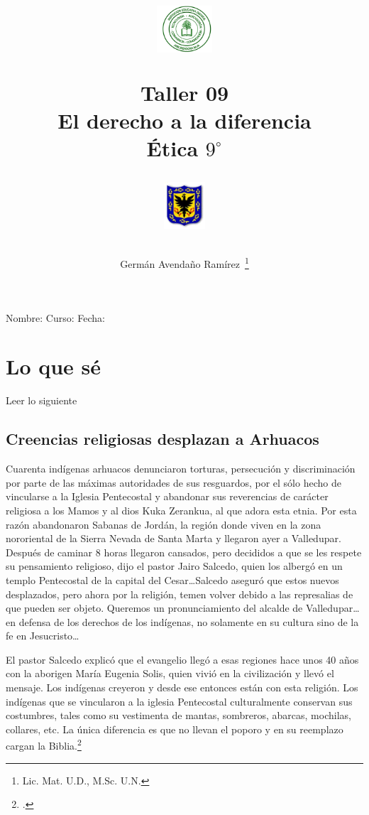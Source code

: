 \documentclass[10pt,twoside]{article}
\author{Germ\'an Avenda\~no Ram\'irez~\thanks{Lic. Mat. U.D., M.Sc. U.N.}}
\title{\begin{minipage}{.2\textwidth}
\includegraphics[height=1.75cm]{Images/logo-colegio.png}\end{minipage}
\begin{minipage}{.55\textwidth}
\begin{center}
Taller 09\\
El derecho a la diferencia\\
Ética $9^{\circ}$
\end{center}
\end{minipage}\hfill
\begin{minipage}{.2\textwidth}
\includegraphics[height=1.75cm]{Images/logo-sed.png} 
\end{minipage}}
\date{}
\begin{document}
\maketitle
Nombre: \hrulefill Curso: \underline{\hspace*{44pt}} Fecha: \underline{\hspace*{2.5cm}}
\section*{Lo que s\'{e}}
Leer lo siguiente
\subsection*{Creencias religiosas desplazan a Arhuacos}
Cuarenta indígenas arhuacos denunciaron torturas, persecución y discriminación por parte de las máximas autoridades de sus resguardos, por el sólo hecho de vincularse a la Iglesia Pentecostal y abandonar sus reverencias de carácter religiosa a los Mamos y al dios Kuka Zerankua, al que adora esta etnia. Por esta razón abandonaron Sabanas de Jordán,
la región donde viven en la zona nororiental de la Sierra Nevada de Santa Marta y llegaron ayer a Valledupar. Después de caminar 8 horas llegaron cansados, pero decididos a que se les respete su pensamiento religioso, dijo el pastor Jairo Salcedo, quien los albergó en un templo Pentecostal de la capital del Cesar\ldots Salcedo aseguró que estos nuevos desplazados, pero ahora por la religión, temen volver debido a
las represalias de que pueden ser objeto. Queremos un pronunciamiento del alcalde de Valledupar\ldots en defensa de los derechos de los indígenas, no solamente en su cultura sino de la fe en Jesucristo\ldots

El pastor Salcedo explicó que el evangelio llegó a esas regiones hace unos 40 años con la aborigen María Eugenia Solis, quien vivió en la civilización y llevó el mensaje. Los indígenas creyeron y desde ese entonces están con esta religión. Los indígenas que se vincularon a la iglesia Pentecostal culturalmente conservan sus costumbres, tales como su vestimenta de mantas, sombreros, abarcas, mochilas, collares, etc. La única diferencia es que no llevan el poporo y en su reemplazo cargan la Biblia.\footcite{Periódico El Tiempo, 23 de Mayo de 1997 (Fragmento)}
\end{document}
